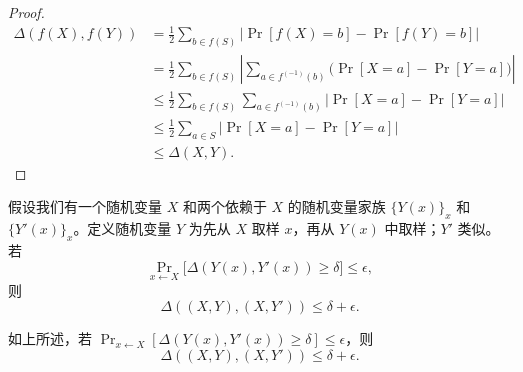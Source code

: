 \documentclass[american,singlepageview]{snargs-book-zh}
\newcommand{\RandomVariableX}{X}
\newcommand{\RandomVariableY}{Y}
\newcommand{\RandomVariableSupport}{S}
\newcommand{\StatisticalDistanceSymbol}{\Delta}
\newcommand{\StatisticalDistance}[2]{\StatisticalDistanceSymbol\left(#1,#2\right)}
\newcommand{\AbsValue}[1]{\left|{#1}\right|}
\begin{document}
\begin{proof}
\begin{align*}
\StatisticalDistance{f(\RandomVariableX)}{f(\RandomVariableY)}
&=
\frac{1}{2} \sum_{b \in f(\RandomVariableSupport)} \AbsValue{\Pr[f(\RandomVariableX)=b]-\Pr[f(\RandomVariableY)=b]}
\\ &=
\frac{1}{2}
\sum_{b \in f(\RandomVariableSupport)}
\AbsValue{\sum_{a \in f^{(-1)}(b)}\bigl(\Pr[\RandomVariableX=a]-\Pr[\RandomVariableY=a]\bigr)}
\\ &\leq
\frac{1}{2}
\sum_{b \in f(\RandomVariableSupport)}
\sum_{a \in f^{(-1)}(b)}
\AbsValue{\Pr[\RandomVariableX=a]-\Pr[\RandomVariableY=a]}
\\ &\leq
\frac{1}{2}
\sum_{a \in \RandomVariableSupport}
\AbsValue{\Pr[\RandomVariableX=a]-\Pr[\RandomVariableY=a]}
\\ &\leq
\StatisticalDistance{\RandomVariableX}{\RandomVariableY}.
\end{align*}
\end{proof}

假设我们有一个随机变量 $\RandomVariableX$ 和两个依赖于 $\RandomVariableX$ 的随机变量家族 $\{\RandomVariableY(x)\}_{x}$ 和 $\{\RandomVariableY'(x)\}_{x}$。定义随机变量 $\RandomVariableY$ 为先从 $\RandomVariableX$ 取样 $x$，再从 $\RandomVariableY(x)$ 中取样；$\RandomVariableY'$ 类似。若
\[
\Pr_{x \gets \RandomVariableX}\bigl[\StatisticalDistance{\RandomVariableY(x)}{\RandomVariableY'(x)} \geq \delta\bigr] \leq \epsilon,
\]
则
\[
\StatisticalDistance{(\RandomVariableX,\RandomVariableY)}{(\RandomVariableX,\RandomVariableY')} \leq \delta + \epsilon.
\]

\begin{claim}
\label{claim:statistical-distance-for-derived-variables}
如上所述，若 $\Pr_{x \gets \RandomVariableX}[\StatisticalDistance{\RandomVariableY(x)}{\RandomVariableY'(x)} \geq \delta] \leq \epsilon$，则
\[
\StatisticalDistance{(\RandomVariableX,\RandomVariableY)}{(\RandomVariableX,\RandomVariableY')} \leq \delta + \epsilon.
\]
\end{claim}
\end{document}
